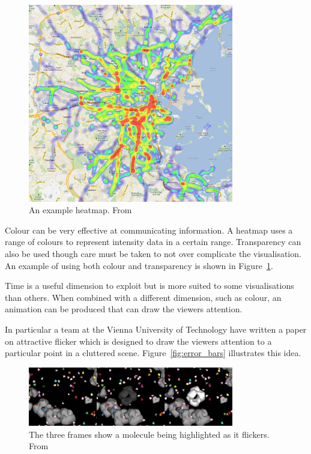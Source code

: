 \documentclass[
  oneside,
  11pt, a4paper,
  footinclude=true,
  headinclude=true,
  cleardoublepage=empty
]{scrbook}
\begin{document}
\begin{figure}[h]
    \centering
	\includegraphics[width=0.8\textwidth]{images/heatmap.png}
    \caption{An example heatmap. From \cite{heatmap}}
    \label{fig:heatmap}
\end{figure}

Colour can be very effective at communicating information. A heatmap uses a range of colours to represent intensity data in a certain range. Transparency can also be used though care must be taken to not over complicate the visualisation. An example of using both colour and transparency is shown in Figure~\ref{fig:heatmap}.

Time is a useful dimension to exploit but is more suited to some visualisations than others. When combined with a different dimension, such as colour, an animation can be produced that can draw the viewers attention.

In particular a team at the Vienna University of Technology have written a paper on attractive flicker which is designed to draw the viewers attention to a particular point in a cluttered scene\cite{attractiveflicker}. Figure~\ref{fig:error_bars} illustrates this idea.

\begin{figure}[h]
    \centering
	\includegraphics[width=0.8\textwidth]{images/flicker.png}
    \caption{The three frames show a molecule being highlighted as it flickers. From \cite{attractiveflicker}}
    \label{fig:flicker}
\end{figure}
\end{document}
